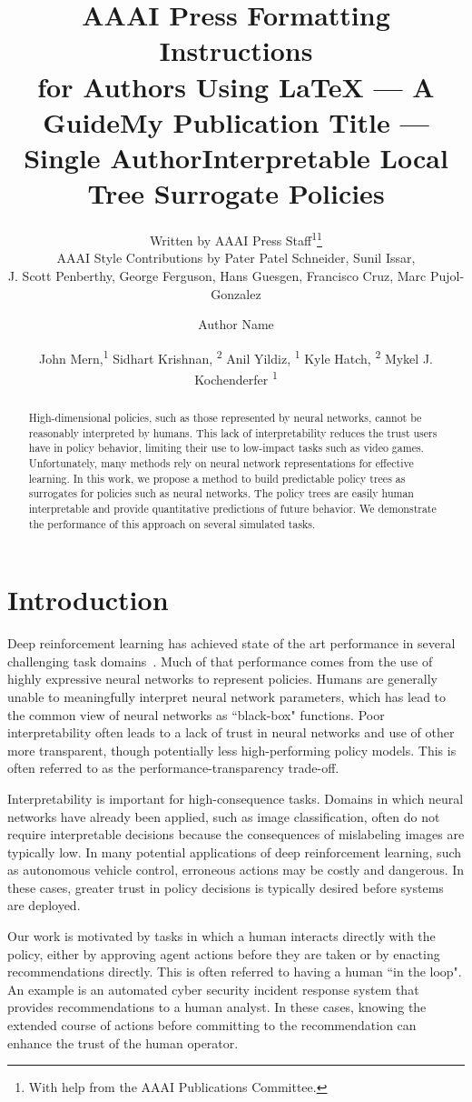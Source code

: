 \documentclass[letterpaper]{article} %
\title{AAAI Press Formatting Instructions \\for Authors Using \LaTeX{} --- A Guide}
\author{
Written by AAAI Press Staff\textsuperscript{\rm 1}\thanks{With help from the AAAI Publications Committee.}\\
AAAI Style Contributions by Pater Patel Schneider,
Sunil Issar,\\
J. Scott Penberthy,
George Ferguson,
Hans Guesgen,
Francisco Cruz\equalcontrib,
Marc Pujol-Gonzalez\equalcontrib
}
\title{My Publication Title --- Single Author}
\author {
Author Name
}
\title{Interpretable Local Tree Surrogate Policies}
\author {
John Mern,\textsuperscript{\rm 1}
Sidhart Krishnan, \textsuperscript{\rm 2}
Anil Yildiz, \textsuperscript{\rm 1}
Kyle Hatch, \textsuperscript{\rm 2}
Mykel J. Kochenderfer \textsuperscript{\rm 1}
}
\begin{document}
\maketitle
\begin{abstract}
High-dimensional policies, such as those represented by neural networks, cannot be reasonably interpreted by humans.
This lack of interpretability reduces the trust users have in policy behavior, limiting their use to low-impact tasks such as video games.
Unfortunately, many methods rely on neural network representations for effective learning.
In this work, we propose a method to build predictable policy trees as surrogates for policies such as neural networks.
The policy trees are easily human interpretable and provide quantitative predictions of future behavior.
We demonstrate the performance of this approach on several simulated tasks.
\end{abstract}
\section{Introduction}

Deep reinforcement learning has achieved state of the art performance in several challenging task domains~\cite{mnih2015}.
Much of that performance comes from the use of highly expressive neural networks to represent policies.
Humans are generally unable to meaningfully interpret neural network parameters, which has lead to the common view of neural networks as ``black-box" functions.
Poor interpretability often leads to a lack of trust in neural networks and use of other more transparent, though potentially less high-performing policy models.
This is often referred to as the performance-transparency trade-off. %

Interpretability is important for high-consequence tasks.
Domains in which neural networks have already been applied, such as image classification, often do not require interpretable decisions because the consequences of mislabeling images are typically low.
In many potential applications of deep reinforcement learning, such as autonomous vehicle control, erroneous actions may be costly and dangerous.
In these cases, greater trust in policy decisions is typically desired before systems are deployed.

Our work is motivated by tasks in which a human interacts directly with the policy, either by approving agent actions before they are taken or by enacting recommendations directly.
This is often referred to having a human ``in the loop".
An example is an automated cyber security incident response system that provides recommendations to a human analyst.
In these cases, knowing the extended course of actions before committing to the recommendation can enhance the trust of the human operator.
\end{document}
